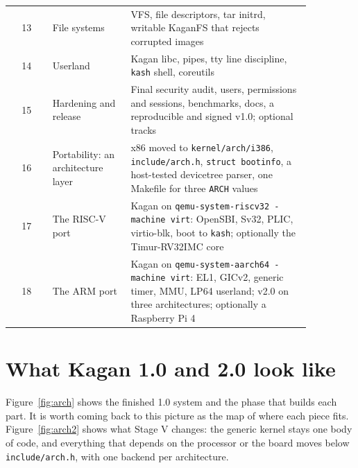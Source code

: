\documentclass[11pt,a4paper]{article}
\begin{document}
\begin{center}
\begin{longtable}{@{}c >{\raggedright\arraybackslash}p{0.26\linewidth} >{\raggedright\arraybackslash}p{0.6\linewidth}@{}}
13 & File systems & VFS, file descriptors, tar initrd, writable KaganFS that rejects corrupted images \\
14 & Userland & Kagan libc, pipes, tty line discipline, \texttt{kash} shell, coreutils \\
15 & Hardening and release & Final security audit, users, permissions and sessions, benchmarks, docs, a reproducible and signed v1.0; optional tracks \\
\midrule
16 & Portability: an architecture layer & x86 moved to \texttt{kernel/arch/i386}, \texttt{include/arch.h}, \texttt{struct bootinfo}, a host-tested devicetree parser, one Makefile for three \texttt{ARCH} values \\
17 & The RISC-V port & Kagan on \texttt{qemu-system-riscv32 -machine virt}: OpenSBI, Sv32, PLIC, virtio-blk, boot to \texttt{kash}; optionally the Timur-RV32IMC core \\
18 & The ARM port & Kagan on \texttt{qemu-system-aarch64 -machine virt}: EL1, GICv2, generic timer, MMU, LP64 userland; v2.0 on three architectures; optionally a Raspberry Pi 4 \\
\end{longtable}
\end{center}



\section{What Kagan 1.0 and 2.0 look like}

Figure~\ref{fig:arch} shows the finished 1.0 system and the phase that builds each part. It is worth coming back to
this picture as the map of where each piece fits. Figure~\ref{fig:arch2} shows what Stage V changes: the
generic kernel stays one body of code, and everything that depends on the processor or the board moves below
\texttt{include/arch.h}, with one backend per architecture.
\end{document}
